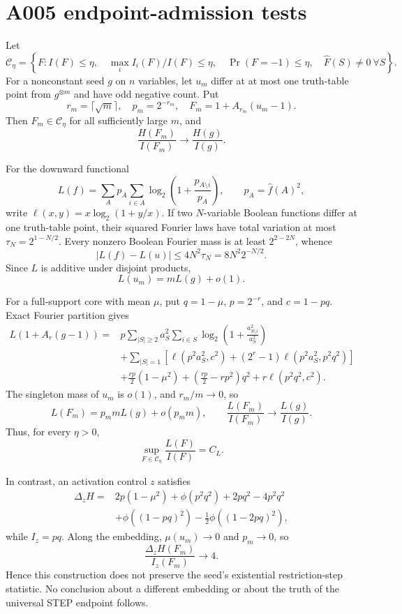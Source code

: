 \section*{A005 endpoint-admission tests}

Let
\[
\mathcal C_\eta=\left\{F:
I(F)\le\eta,\quad \max_i I_i(F)/I(F)\le\eta,\quad
\Pr(F=-1)\le\eta,\quad \widehat F(S)\ne0\ \forall S\right\}.
\]
For a nonconstant seed $g$ on $n$ variables, let $u_m$ differ at at
most one truth-table point from $g^{\otimes m}$ and have odd negative
count.  Put
\[
r_m=\lceil\sqrt m\rceil,\quad p_m=2^{-r_m},\quad
F_m=1+A_{r_m}(u_m-1).
\]
Then $F_m\in\mathcal C_\eta$ for all sufficiently large $m$, and
\[
\frac{H(F_m)}{I(F_m)}\to\frac{H(g)}{I(g)}.
\]

For the downward functional
\[
L(f)=\sum_Ap_A\sum_{i\in A}
\log_2\left(1+\frac{p_{A\setminus i}}{p_A}\right),
\qquad p_A=\widehat f(A)^2,
\]
write $\ell(x,y)=x\log_2(1+y/x)$.  If two $N$-variable Boolean
functions differ at one truth-table point, their squared Fourier laws
have total variation at most $\tau_N=2^{1-N/2}$.  Every nonzero Boolean
Fourier mass is at least $2^{2-2N}$, whence
\[
|L(f)-L(u)|\le4N^2\tau_N=8N^2 2^{-N/2}.
\]
Since $L$ is additive under disjoint products,
\[
L(u_m)=mL(g)+o(1).
\]

For a full-support core with mean $\mu$, put $q=1-\mu$, $p=2^{-r}$,
and $c=1-pq$.  Exact Fourier partition gives
\[
\begin{aligned}
L(1+A_r(g-1))={}&p\sum_{|S|\ge2}a_S^2
\sum_{i\in S}\log_2\left(1+\frac{a_{S\setminus i}^2}{a_S^2}\right)\\
&+\sum_{|S|=1}\left[\ell(p^2a_S^2,c^2)
+(2^r-1)\ell(p^2a_S^2,p^2q^2)\right]\\
&+\frac{rp}{2}(1-\mu^2)
+\left(\frac{rp}{2}-rp^2\right)q^2+r\ell(p^2q^2,c^2).
\end{aligned}
\]
The singleton mass of $u_m$ is $o(1)$, and $r_m/m\to0$, so
\[
L(F_m)=p_m mL(g)+o(p_m m),\qquad
\frac{L(F_m)}{I(F_m)}\to\frac{L(g)}{I(g)}.
\]
Thus, for every $\eta>0$,
\[
\sup_{F\in\mathcal C_\eta}\frac{L(F)}{I(F)}=C_L.
\]

In contrast, an activation control $z$ satisfies
\[
\begin{aligned}
\Delta_zH={}&2p(1-\mu^2)+\phi(p^2q^2)+2pq^2-4p^2q^2\\
&+\phi((1-pq)^2)-\frac12\phi((1-2pq)^2),
\end{aligned}
\]
while $I_z=pq$.  Along the embedding, $\mu(u_m)\to0$ and $p_m\to0$,
so
\[
\frac{\Delta_zH(F_m)}{I_z(F_m)}\to4.
\]
Hence this construction does not preserve the seed's existential
restriction-step statistic.  No conclusion about a different embedding
or about the truth of the universal STEP endpoint follows.

